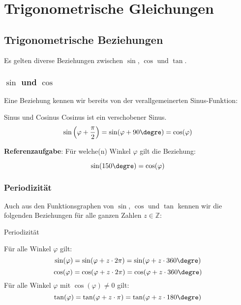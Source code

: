 
\section{Trigonometrische Gleichungen}


\subsection{Trigonometrische Beziehungen}
Es gelten diverse Beziehungen zwischen $\sin$, $\cos$ und $\tan$.

\subsubsection{$\sin$ und $\cos$}
Eine Beziehung kennen wir bereits von der verallgemeinerten
Sinus-Funktion:

\begin{bemerkung}{Sinus und Cosinus}{}
  Cosinus ist ein verschobener Sinus.
  $$\sin\left(\varphi+\frac{\pi}{2}\right) = \sin(\varphi+90\degre)= \cos(\varphi)$$
\end{bemerkung}

\textbf{Referenzaufgabe}: Für welche(n) Winkel $\varphi$ gilt die Beziehung:

$$\sin(150\degre) = \cos(\varphi)$$



\subsubsection{Periodizität}
Auch aus den Funktionsgraphen von $\sin$, $\cos$ und $\tan$ kennen wir die
folgenden Beziehungen für alle ganzen Zahlen $z\in\mathbb{Z}$:
\begin{bemerkung}{Periodizität}{}

  Für alle Winkel $\varphi$ gilt:
  $$\sin(\varphi) = \sin(\varphi + z\cdot2\pi) = \sin(\varphi + z\cdot360\degre)$$
  $$\cos(\varphi) = \cos(\varphi + z\cdot2\pi) = \cos(\varphi + z\cdot360\degre)$$
  Für alle Winkel $\varphi$ mit $\cos(\varphi)\ne 0$ gilt:
  $$\tan(\varphi) = \tan(\varphi + z\cdot\pi) =\tan(\varphi + z\cdot{}180\degre)$$
  \end{bemerkung}
\newpage

